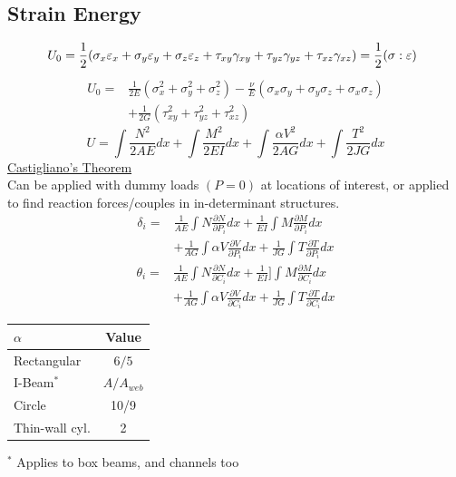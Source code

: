 \documentclass[twocolumn, 12pt]{article}    %
\begin{document}
\subsection*{Strain Energy}
\begin{equation*}
    \hspace{-5pt} U_0 = \frac{1}{2} (\sigma_x\varepsilon_x +\sigma_y\varepsilon_y + \sigma_z\varepsilon_z + \tau_{xy}\gamma_{xy} + \tau_{yz}\gamma_{yz} + \tau_{xz}\gamma_{xz}) = \frac{1}{2}(\sigma : \varepsilon)
\end{equation*}
\begin{align*}
    U_0 =& \frac{1}{2E}(\sigma_x^2 + \sigma_y^2 + \sigma_z^2) -\frac{\nu}{E}(\sigma_x\sigma_y + \sigma_y\sigma_z +\sigma_x\sigma_z) \\
    &+\frac{1}{2G} (\tau_{xy}^2 + \tau_{yz}^2 + \tau_{xz}^2)
\end{align*}
\begin{equation*}
    U = \int \frac{N^2}{2AE}dx + \int \frac{M^2}{2EI}dx + \int \frac{\alpha V^2}{2AG}dx + \int \frac{T^2}{2JG}dx
\end{equation*}
\underline{Castigliano's Theorem}\\
Can be applied with dummy loads \((P=0)\) at locations of interest, or applied to find reaction forces/couples in in-determinant structures.
\begin{align*}
    \delta_i =& \frac{1}{AE} \int N  \frac{\partial{N}}{\partial{P_i}}dx + \frac{1}{EI} \int M  \frac{\partial{M}}{\partial{P_i}}dx \\
    &+\frac{1}{AG} \int \alpha V  \frac{\partial{V}}{\partial{P_i}} dx + \frac{1}{JG} \int T  \frac{\partial{T}}{\partial{P_i}}dx
\end{align*}
\begin{align*}
    \theta_i =& \frac{1}{AE} \int N \frac{\partial{N}}{\partial{C_i}}dx + \frac{1}{EI} ]\int M \frac{\partial{M}}{\partial{C_i}} dx \\
    &+\frac{1}{AG} \int \alpha V  \frac{\partial{V}}{\partial{C_i}}dx + \frac{1}{JG} \int T  \frac{\partial{T}}{\partial{C_i}}dx
\end{align*}
\begin{table}[h!]
    \centering
    \footnotesize
    \begin{tabular}{l|c}
        \(\alpha\) & Value \\
        \hline
        Rectangular & \(6/5\)\\
        I-Beam\(^*\) & \(A/A_{web}\)\\
        Circle &10/9\\
        Thin-wall cyl. & 2
    \end{tabular}
\end{table}
\(^*\) Applies to box beams, and channels too
\end{document}
